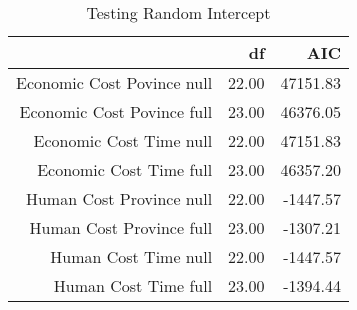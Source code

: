 
\begin{table}[ht]
	   \caption{Testing Random Intercept} 
	\label{aic}
\centering
\begin{tabular}{rrr}
  \hline
 & df & AIC \\ 
  \hline
Economic Cost Povince null & 22.00 & 47151.83 \\ 
Economic Cost Povince full & 23.00 & 46376.05 \\ 
Economic Cost Time null & 22.00 & 47151.83 \\ 
Economic Cost Time full & 23.00 & 46357.20 \\ 
Human Cost Province null & 22.00 & -1447.57 \\ 
Human Cost Province full & 23.00 & -1307.21 \\ 
Human Cost Time null & 22.00 & -1447.57 \\  
Human Cost Time full & 23.00 & -1394.44 \\ 
   \hline
\end{tabular}
\end{table}

